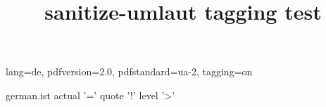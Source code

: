 \DocumentMetadata
  {
    lang=de,
    pdfversion=2.0,
    pdfstandard=ua-2,
    tagging=on
  }
\begin{filecontents}{german.ist}
actual '=' %
quote '!' %
level '>' %
\end{filecontents}
\documentclass[a4paper,12pt]{article}
\ifdefined\Uchar
\else
  \usepackage[T1]{fontenc}
\fi
\usepackage[ngerman]{babel}
\usepackage{makeidx}
\usepackage{sanitize-umlaut}
\usepackage[hyperindex,colorlinks]{hyperref}
\makeindex

\title{sanitize-umlaut tagging test}


\section{Basic Example}
Test äöüÄÖÜß.
\index{Aber} \index{Arg} \index{Ärger}
\index{Ofen} \index{Ö - wie schön} \index{oberhalb}
\index{Ufer} \index{Übermaß}
\index{Latex=\LaTeX} \index{Ärger>Index}
Test äöüÄÖÜß.
\printindex
